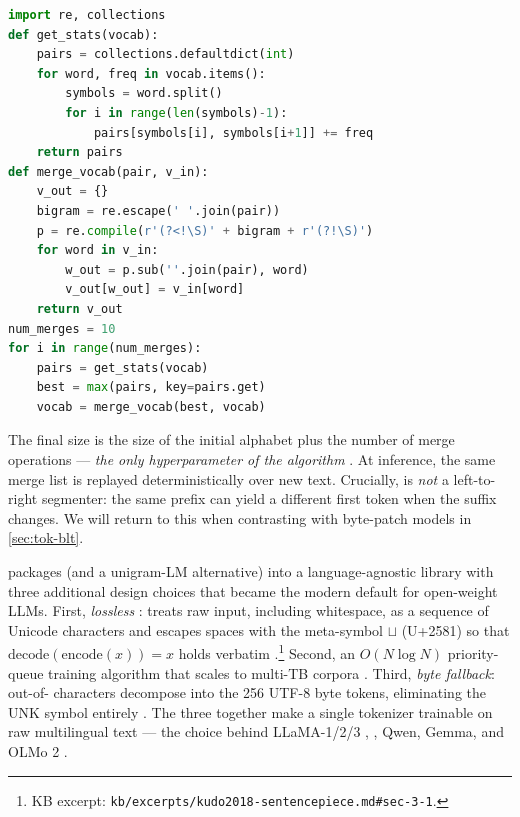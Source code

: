\begin{lstlisting}[language=Python, caption={BPE training (Sennrich et al.\ 2016, \S 3.2)}, label=lst:bpe]
import re, collections
def get_stats(vocab):
    pairs = collections.defaultdict(int)
    for word, freq in vocab.items():
        symbols = word.split()
        for i in range(len(symbols)-1):
            pairs[symbols[i], symbols[i+1]] += freq
    return pairs
def merge_vocab(pair, v_in):
    v_out = {}
    bigram = re.escape(' '.join(pair))
    p = re.compile(r'(?<!\S)' + bigram + r'(?!\S)')
    for word in v_in:
        w_out = p.sub(''.join(pair), word)
        v_out[w_out] = v_in[word]
    return v_out
num_merges = 10
for i in range(num_merges):
    pairs = get_stats(vocab)
    best = max(pairs, key=pairs.get)
    vocab = merge_vocab(best, vocab)
\end{lstlisting}

The final  size is the size of the initial alphabet plus the
number of merge operations — \emph{the only hyperparameter of the
algorithm} \citep[\S 3.2]{sennrich2016}. At inference, the same merge
list is replayed deterministically over new text. Crucially,  is
\emph{not} a left-to-right segmenter: the same prefix can yield a
different first token when the suffix changes. We will return to this
when contrasting with byte-patch models in \cref{sec:tok-blt}.

\citet{kudo2018-sentencepiece} packages  (and a unigram-LM
alternative) into a language-agnostic library with three additional
design choices that became the modern default for open-weight LLMs.
First, \emph{lossless }:  treats raw input,
including whitespace, as a sequence of Unicode characters and escapes
spaces with the meta-symbol $\sqcup$ (U+2581) so that
$\mathrm{decode}(\mathrm{encode}(x)) = x$ holds verbatim
\citep[\S 3.1]{kudo2018-sentencepiece}.\footnote{KB excerpt:
\nolinkurl{kb/excerpts/kudo2018-sentencepiece.md#sec-3-1}.} Second, an
$O(N \log N)$ priority-queue training algorithm that scales to multi-TB
corpora \citep[\S 3.2]{kudo2018-sentencepiece}. Third, \emph{byte
fallback}: out-of- characters decompose into the 256 UTF-8
byte tokens, eliminating the UNK symbol entirely
\citep[\S byte-fallback]{kudo2018-sentencepiece}. The three together
make a single tokenizer trainable on raw multilingual text — the choice
behind LLaMA-1/2/3 \citep{touvron2023, meta-llama3}, , Qwen,
Gemma, and OLMo 2 \citep{olmo2}.

